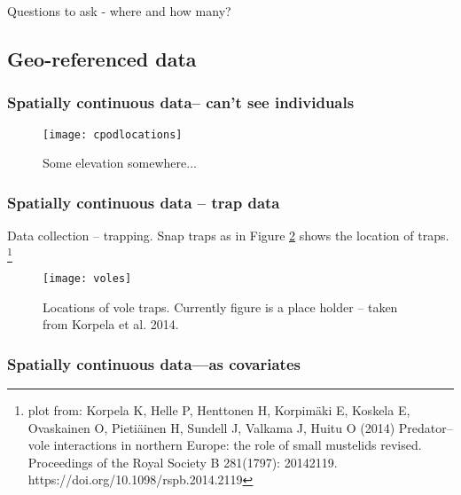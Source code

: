 Questions to ask - where and how many?


\subsection{Geo-referenced data}

\subsubsection{Spatially continuous data-- can't see individuals}\label{subsub:noindi}
\begin{figure}
\centering
\texttt{[image: cpodlocations]}
\caption{\label{fig:elev} Some elevation somewhere...}
\end{figure}

\subsubsection{Spatially continuous data -- trap data}
Data collection -- trapping. Snap traps as in
Figure \ref{fig:voles} shows the location of traps. \footnote{plot from: Korpela K, Helle P, Henttonen H, Korpimäki E, Koskela E, Ovaskainen O, Pietiäinen H, Sundell J, Valkama J, Huitu O (2014) Predator–vole interactions in northern Europe: the role of small mustelids revised. Proceedings of the Royal Society B 281(1797): 20142119. https://doi.org/10.1098/rspb.2014.2119}

\begin{figure}
\centering
\texttt{[image: voles]}
\caption{\label{fig:voles} Locations of vole traps. Currently figure is a place holder -- taken from Korpela et al. 2014.}
\end{figure}




\subsubsection{Spatially continuous data---as covariates}

